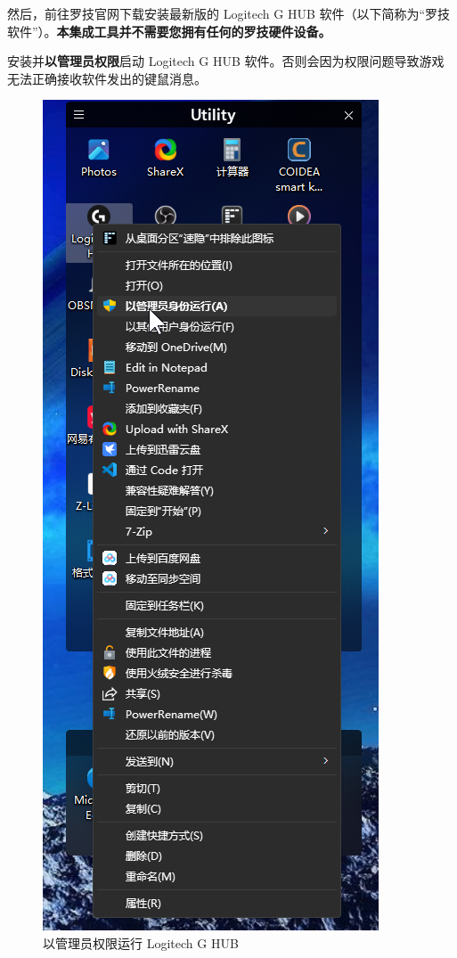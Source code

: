 然后，前往罗技官网下载安装最新版的 Logitech G HUB 软件（以下简称为“罗技软件”）。\textbf{\color{red}本集成工具并不需要您拥有任何的罗技硬件设备。}

安装并\textbf{\color{red}以管理员权限}启动 Logitech G HUB 软件。否则会因为权限问题导致游戏无法正确接收软件发出的键鼠消息。

\begin{figure}[H]
    \Centering
    \includegraphics[width=\textwidth]{docs/assets/run_lghub.png}
    \caption{以管理员权限运行 Logitech G HUB}
\end{figure}


